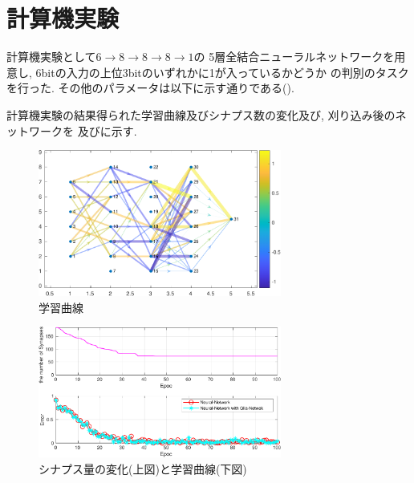 \documentclass[a4paper, 10.5pt,twocolumn,dvipdfmx]{jsarticle}
\begin{document}
\section{計算機実験}
計算機実験として$6\rightarrow 8\rightarrow 8\rightarrow 8\rightarrow 1$の
5層全結合ニューラルネットワークを用意し, 
6bitの入力の上位3bitのいずれかに1が入っているかどうか
の判別のタスクを行った.
その他のパラメータは以下に示す通りである().
\vspace{-0.5cm}
\begin{table}[H]
  \caption{パラメータ一覧}
  \label{tab:param}
  \centering
 \end{table}
計算機実験の結果得られた学習曲線及びシナプス数の変化及び, 刈り込み後のネットワークを
及びに示す.
\begin{figure}[H]
  \centering
  \includegraphics[width=8cm]{Graph-crop.pdf} 
  \caption{学習曲線}
  \label{fig:Graph}
\end{figure}
\vspace{-2zh}
\begin{figure}[H]
  \centering
  \includegraphics[width=8cm]{Subploting-crop.pdf} 
  \caption{シナプス量の変化(上図)と学習曲線(下図)}
  \label{fig:SynapseNum}
\end{figure}
\vspace{-2zh}
\end{document}

